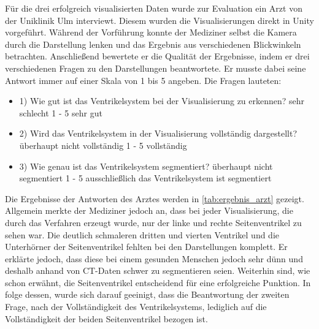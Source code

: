 Für die drei erfolgreich visualisierten Daten wurde zur Evaluation ein Arzt von der Uniklinik Ulm interviewt. Diesem wurden die Visualisierungen direkt in Unity vorgeführt. Während der Vorführung konnte der Mediziner selbst die Kamera durch die Darstellung lenken und das Ergebnis aus verschiedenen Blickwinkeln betrachten. Anschließend bewertete er die Qualität der Ergebnisse, indem er drei verschiedenen Fragen zu den Darstellungen beantwortete. Er musste dabei seine Antwort immer auf einer Skala von 1 bis 5 angeben.
\newline
Die Fragen lauteten:
\begin{itemize}
	\item 1) Wie gut ist das Ventrikelsystem bei der Visualisierung zu erkennen? \newline sehr schlecht 1 - 5 sehr gut
	\item 2) Wird das Ventrikelsystem in der Visualisierung vollständig dargestellt? \newline überhaupt nicht vollständig 1 - 5 vollständig
	\item 3) Wie genau ist das Ventrikelsystem segmentiert? \newline überhaupt nicht segmentiert 1 - 5 ausschließlich das Ventrikelsystem ist segmentiert
\end{itemize}


Die Ergebnisse der Antworten des Arztes werden in \autoref{tab:ergebnis_arzt} gezeigt. Allgemein merkte der Mediziner jedoch an, dass bei jeder Visualisierung, die durch das Verfahren erzeugt wurde, nur der linke und rechte Seitenventrikel zu sehen war. Die deutlich schmaleren dritten und vierten Ventrikel und die Unterhörner der Seitenventrikel fehlten bei den Darstellungen komplett. Er erklärte jedoch, dass diese bei einem gesunden Menschen jedoch sehr dünn und deshalb anhand von CT-Daten schwer zu segmentieren seien. Weiterhin sind, wie schon erwähnt, die Seitenventrikel entscheidend für eine erfolgreiche Punktion. In folge dessen, wurde sich darauf geeinigt, dass die Beantwortung der zweiten Frage, nach der Vollständigkeit des Ventrikelsystems, lediglich auf die Vollständigkeit der beiden Seitenventrikel bezogen ist.

\begin{table}[h]
\centering
{}
\caption{Ergebnisse des Interviews mit einem Arzt}
\label{tab:ergebnis_arzt}
\end{table}


